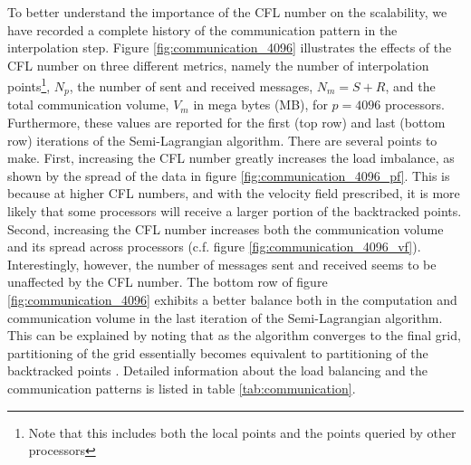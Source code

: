 To better understand the importance of the CFL number on the scalability, we have recorded a complete history of the communication pattern in the interpolation step. Figure \ref{fig:communication_4096} illustrates the effects of the CFL number on three different metrics, namely the number of interpolation points\footnote{Note that this includes both the local points and the points queried by other processors}, $N_p$, the number of sent and received messages, $N_m = S + R$, and the total communication volume, $V_m$ in mega bytes (MB), for $p=4096$ processors. Furthermore, these values are reported for the first (top row) and last (bottom row) iterations of the Semi-Lagrangian algorithm. There are several points to make. First, increasing the CFL number greatly increases the load imbalance, as shown by the spread of the data in figure \ref{fig:communication_4096_pf}. This is because at higher CFL numbers, and with the velocity field prescribed, it is more likely that some processors will receive a larger portion of the backtracked points. Second, increasing the CFL number increases both the communication volume and its spread across processors (c.f. figure \ref{fig:communication_4096_vf}). Interestingly, however, the number of messages sent and received seems to be unaffected by the CFL number. The bottom row of figure \ref{fig:communication_4096} exhibits a better balance both in the computation and communication volume in the last iteration of the Semi-Lagrangian algorithm. This can be explained by noting that as the algorithm converges to the final grid, partitioning of the grid essentially becomes equivalent to partitioning of the backtracked points . Detailed information about the load balancing and the communication patterns is listed in table \ref{tab:communication}.
